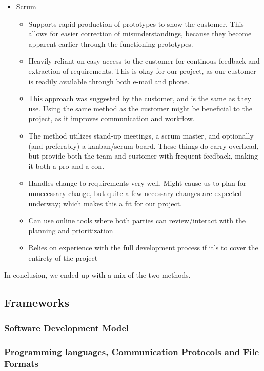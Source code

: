 \begin{itemize}
	\item Scrum
	\begin{itemize}
		\item Supports rapid production of prototypes to show the customer. This allows for easier correction of misunderstandings, because they become apparent earlier through the functioning prototypes.
		\item Heavily reliant on easy access to the customer for continous feedback and extraction of requirements. This is okay for our project, as our customer is readily available through both e-mail and phone. %
		\item This approach was suggested by the customer, and is the same as they use. Using the same method as the customer might be beneficial to the project, as it improves communication and workflow.
		\item The method utilizes stand-up meetings, a scrum master, and optionally (and preferably) a kanban/scrum board. These things do carry overhead, but provide both the team and customer with frequent feedback, making it both a pro and a con.
		\item Handles change to requirements very well. Might cause us to plan for unnecessary change, but quite a few necessary changes are expected underway; which makes this a fit for our project. %
		\item Can use online tools where both parties can review/interact with the planning and prioritization %
		\item Relies on experience with the full development process if it’s to cover the entirety of the project %
	\end{itemize}
\end{itemize}
In conclusion, we ended up with a mix of the two methods. %
\subsection{Frameworks}
\subsubsection{Software Development Model}
\subsubsection{Programming languages, Communication Protocols and File Formats}
